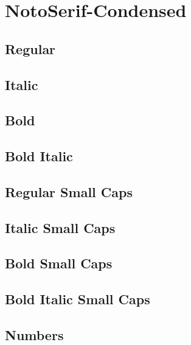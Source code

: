 \documentclass{article}
\begin{document}
\section*{NotoSerif-Condensed}


\subsection*{Regular}
\lipsum[1]

\subsection*{Italic}
\textit{\lipsum[2]}

\subsection*{Bold}

\textbf{\lipsum[3]}



\subsection*{Bold Italic}

\textbf{\textit{\lipsum[4]}}

\subsection*{Regular Small Caps}
\textsc{\lipsum[1]}

\subsection*{Italic Small Caps}
\textsc{\textit{\lipsum[2]}}

\subsection*{Bold Small Caps}

\textsc{\textbf{\lipsum[3]}}



\subsection*{Bold Italic Small Caps}
\textsc{\textbf{\textit{\lipsum[4]}}}

\subsection*{Numbers}
\end{document}

